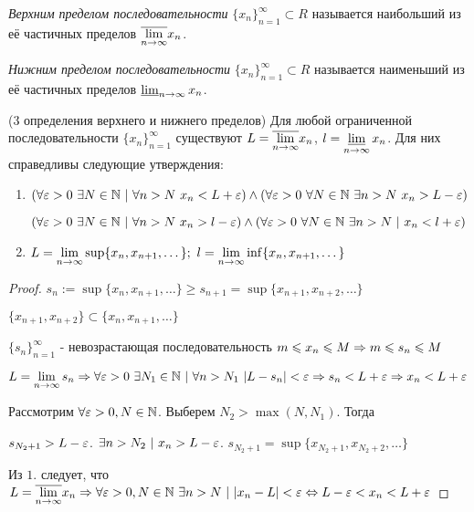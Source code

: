 \begin{definition}
	\textit{Верхним пределом последовательности} $\{x_n\}_{n = 1}^\infty \subset R$ называется наибольший из её частичных пределов $\overline{\lim\limits_{n \rightarrow \infty}} x_n$.
\end{definition}

\begin{definition}
	\textit{Нижним пределом последовательности} $\{x_n\}_{n = 1}^\infty \subset R$ называется наименьший из её частичных пределов $\operatorname{\underline{lim}}\limits_{n \rightarrow \infty} x_n$.
\end{definition}

\begin{theorem} (3 определения верхнего и нижнего пределов)
	Для любой ограниченной последовательности $\{x_n\}_{n = 1}^\infty$ существуют $L = \overline{\lim\limits_{n \to \infty}} x_n$, $l = \varliminf\limits_{n \to \infty} x_n$. Для них справедливы следующие утверждения:
	\begin{enumerate}
		\item $(\forall \eps > 0\ \exists N \in \N\ |\ \forall n > N\ x_n < L + \eps) \wedge (\forall \eps > 0\ \forall N \in \N\ \exists n > N\ x_n > L - \eps)$
		
		$(\forall \eps > 0\ \exists N \in \N\ |\ \forall n > N\ x_n > l - \eps) \wedge (\forall \eps > 0\ \forall N \in \N\ \exists n > N\ |\ x_n < l + \eps)$
		
		\item $L = \lim\limits_{n \rightarrow \infty} \sup \{x_n, x_{n + 1}, \dots\};\ l = \lim\limits_{n \rightarrow \infty} \inf \{x_n, x_{n + 1}, \dots\}$
	\end{enumerate}
\end{theorem}

\begin{proof}
	$s_n := \sup \{x_n, x_{n + 1}, \dots\} \ge s_{n + 1} = \sup \{x_{n + 1}, x_{n + 2}, \dots\}$
	
	$\{x_{n + 1}, x_{n + 2}\} \subset \{x_n, x_{n + 1}, \dots\}$
	
	$\{s_n\}_{n = 1}^\infty$ - невозрастающая последовательность $m \leqslant x_n \leqslant M \Rightarrow m \leqslant s_n \leqslant M$
	
	$L = \lim\limits_{n \rightarrow \infty} s_n \Rightarrow \forall \varepsilon > 0\ \exists N_1 \in \mathbb{N}\ |\ \forall n > N_1\ |L - s_n| < \varepsilon \Rightarrow s_n < L + \varepsilon \Rightarrow x_n < L + \varepsilon$
	
	Рассмотрим $\forall \varepsilon > 0, N \in \mathbb{N}$. Выберем $N_2 > \max(N, N_1)$. Тогда
	
	$s_{N_2 + 1} > L - \varepsilon$. $\exists n > N_2\ |\ x_n > L - \varepsilon$.
	$s_{N_2 + 1} = \sup \{x_{N_2 + 1}, x_{N_2 + 2}, \dots\}$
	
	Из $1.$ следует, что $L = \overline{\liml_{n \ra \infty}} x_n \Ra \forall \eps > 0, N \in \N\ \exists n > N\ |\ |x_n - L| < \eps \lra L - \eps < x_n < L + \eps$
	
\end{proof}

